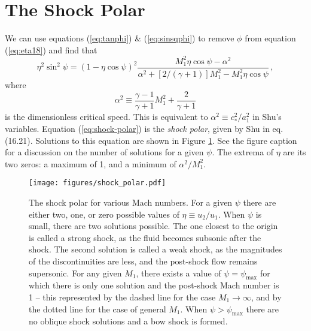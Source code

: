 \documentclass[twocolumn]{aastex631}
\begin{document}
\section{The Shock Polar}
We can use equations (\ref{eq:tanphi}) \& (\ref{eq:sinsqphi}) to remove $\phi$ from equation (\ref{eq:eta18}) and find that
\begin{equation}
    \label{eq:shock-polar}
    \eta^2\sin^2\psi = (1-\eta\cos\psi)^2 \frac{M_1^2\eta\cos\psi - \alpha^2}{\alpha^2 + [2/(\gamma + 1)]M_1^2 - M_1^2\eta\cos\psi}\, ,
\end{equation}
where
\begin{equation}
    \alpha^2 \equiv \frac{\gamma - 1}{\gamma + 1} M_1^2 + \frac{2}{\gamma+1}
\end{equation}
is the dimensionless critical speed. This is equivalent to $\alpha^2\equiv c_*^2/a_1^2$ in Shu's variables. Equation (\ref{eq:shock-polar}) is the {\em shock polar}, given by Shu in eq. (16.21). Solutions to this equation are shown in Figure \ref{fig:shock-polar}. See the figure caption for a discussion on the number of solutions for a given $\psi$. The extrema of $\eta$ are its two zeros: a maximum of 1, and a minimum of $\alpha^2/M_1^2$.

\begin{figure}
    \texttt{[image: figures/shock\_polar.pdf]}
    \caption{The shock polar for various Mach numbers. For a given $\psi$ there are either two, one, or zero possible values of $\eta\equiv u_2/u_1$. When $\psi$ is small, there are two solutions possible. The one closest to the origin is called a strong shock, as the fluid becomes subsonic after the shock. The second solution is called a weak shock, as the magnitudes of the discontinuities are less, and the post-shock flow remains supersonic. For any given $M_1$, there exists a value of $\psi=\psi_\text{max}$ for which there is only one solution and the post-shock Mach number is 1 -- this represented by the dashed line for the case $M_1 \rightarrow \infty$, and by the dotted line for the case of general $M_1$. When $\psi>\psi_\text{max}$ there are no oblique shock solutions and a bow shock is formed.}
    \label{fig:shock-polar}
\end{figure}
\end{document}
